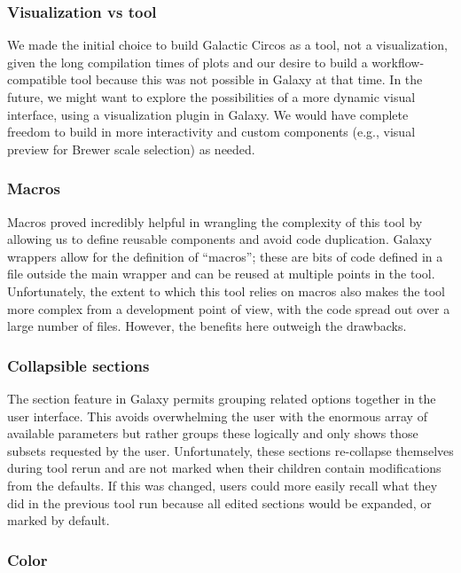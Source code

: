\subsubsection*{Visualization vs tool}

We made the initial choice to build Galactic Circos as a tool, not a visualization, given the long compilation times of plots and our desire to build a workflow-compatible tool because this was not possible in Galaxy at that time.
In the future, we might want to explore the possibilities of a more dynamic visual interface, using a visualization plugin in Galaxy. We would have complete freedom to build in more interactivity and custom components (e.g., visual preview for Brewer scale selection) as needed.

\subsubsection*{Macros}

Macros proved incredibly helpful in wrangling the complexity of this tool by allowing us to define reusable components and avoid code duplication. Galaxy wrappers allow for the definition of ``macros''; these are bits of code defined in a file outside the main wrapper and can be reused at multiple points in the tool. Unfortunately, the extent to which this tool relies on macros also makes the tool more complex from a development point of view, with the code spread out over a large number of files. However, the benefits here outweigh the drawbacks.

\subsubsection*{Collapsible sections}

The section feature in Galaxy permits grouping related options together in the user interface. This avoids overwhelming the user with the enormous array of available parameters but rather groups these logically and only shows those subsets requested by the user. Unfortunately, these sections re-collapse themselves during tool rerun and are not marked when their children contain modifications from the defaults. If this was changed, users could more easily recall what they did in the previous tool run because all edited sections would be expanded, or marked by default.

\subsubsection*{Color}

